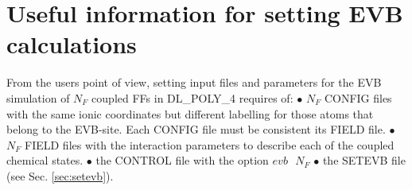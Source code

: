 \section{Useful information for setting EVB calculations}\label{sec:evb-users}

From the users point of view, setting input files and parameters for the EVB simulation of $N_F$ coupled FFs in DL\_POLY\_4 requires of:\newline
$\bullet$ $N_F$ CONFIG files with the same ionic coordinates but different labelling for those atoms that belong to the EVB-site. Each CONFIG file must be consistent its FIELD file.\newline
$\bullet$ $N_F$ FIELD files with the interaction parameters to describe each of the coupled chemical states.\newline
$\bullet$  the CONTROL file with the option $evb\,\,\,\, N_F$\newline 
$\bullet$ the SETEVB file (see Sec. \ref{sec:setevb}).\\

